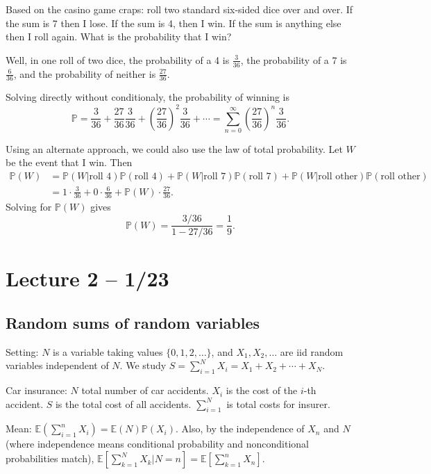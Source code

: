 \documentclass{article}
\newcommand{\PP}{\mathbb{P}}
\newcommand{\E}{\mathbb{E}}
\begin{document}
\begin{example}
  Based on the casino game craps: roll two standard six-sided dice over and over. If the sum is 7 then I lose. If the sum is 4, then I win. If the sum is anything else then I roll again. What is the probability that I win?

  Well, in one roll of two dice, the probability of a 4 is $\frac{3}{36}$, the probability of a 7 is $\frac{6}{36}$, and the probability of neither is $\frac{27}{36}$.

  Solving directly without conditionaly, the probability of winning is
  \[\PP = \frac{3}{36} + \frac{27}{36}\frac{3}{36} + \left(\frac{27}{36}\right)^2 \frac{3}{36} + \cdots = \sum_{n=0}^\infty \left(\frac{27}{36}\right)^n \frac{3}{36}.\]

  Using an alternate approach, we could also use the law of total probability. Let $W$ be the event that I win. Then
  \begin{align*}
    \PP(W) &= \PP(W|\text{roll 4})\PP(\text{roll 4}) + \PP(W|\text{roll 7})\PP(\text{roll 7}) + \PP(W|\text{roll other})\PP(\text{roll other}) \\
    &= 1 \cdot \frac{3}{36} + 0 \cdot \frac{6}{36} + \PP(W) \cdot \frac{27}{36}.
  \end{align*}
  Solving for $\PP(W)$ gives
  \[\PP(W) = \frac{3/36}{1 - 27/36} = \frac{1}{9}.\]
\end{example}

\section{Lecture 2 -- 1/23}
\subsection{Random sums of random variables}
Setting: $N$ is a variable taking values $\{0, 1, 2, \ldots\}$, and $X_1, X_2, \ldots$ are iid random variables independent of $N$. We study $S=\sum_{i=1}^N X_i=X_1+X_2+\cdots+X_N$.
\begin{example}
  Car insurance: $N$ total number of car accidents. $X_i$ is the cost of the $i$-th accident. $S$ is the total cost of all accidents.
  $\sum_{i=1}^{N}$ is total costs for insurer.
\end{example}

Mean: $\E(\sum_{i=1}^{n}X_i)=\E(N)\PP(X_i)$.
Also, by the independence of $X_n$ and $N$ (where independence means conditional probability and nonconditional probabilities match), $\E[\sum_{k=1}^N X_k|N=n]=\E[\sum_{k=1}^{n}X_n]$.
\end{document}
